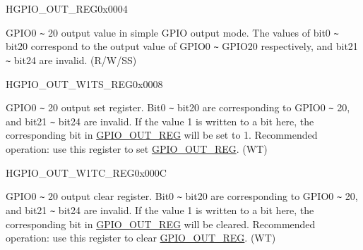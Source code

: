 

\begin{register}{H}{GPIO\_OUT\_REG}{0x0004}\label{regdesc:GPIOOUTREG}
%
%
\regnewline%
\begin{regdesc}\begin{reglist}
\label{fielddesc:GPIOOUTDATAORIG}\item [GPIO\_OUT\_DATA\_ORIG] GPIO0 \verb+~+ 20 output value in simple GPIO output mode. The values of bit0 \verb+~+ bit20 correspond to the output value of GPIO0 \verb+~+ GPIO20 respectively, and bit21 \verb+~+ bit24 are invalid. (R/W/SS)
\end{reglist}\end{regdesc}
\end{register}


\begin{register}{H}{GPIO\_OUT\_W1TS\_REG}{0x0008}\label{regdesc:GPIOOUTW1TSREG}
%
%
\regnewline%
\begin{regdesc}\begin{reglist}
\label{fielddesc:GPIOOUTW1TS}\item [GPIO\_OUT\_W1TS] GPIO0 \verb+~+ 20 output set register. Bit0 \verb+~+ bit20 are corresponding to GPIO0 \verb+~+ 20, and bit21 \verb+~+ bit24 are invalid. If the value 1 is written to a bit here, the corresponding bit in \hyperref[regdesc:GPIOOUTREG]{GPIO\_OUT\_REG} will be set to 1. Recommended operation: use this register to set \hyperref[regdesc:GPIOOUTREG]{GPIO\_OUT\_REG}. (WT)
\end{reglist}\end{regdesc}
\end{register}

\begin{register}{H}{GPIO\_OUT\_W1TC\_REG}{0x000C}\label{regdesc:GPIOOUTW1TCREG}
%
%
\regnewline%
\begin{regdesc}\begin{reglist}
\label{fielddesc:GPIOOUTW1TC}\item [GPIO\_OUT\_W1TC] GPIO0 \verb+~+ 20 output clear register. Bit0 \verb+~+ bit20 are corresponding to GPIO0 \verb+~+ 20, and bit21 \verb+~+ bit24 are invalid. If the value 1 is written to a bit here, the corresponding bit in \hyperref[regdesc:GPIOOUTREG]{GPIO\_OUT\_REG} will be cleared. Recommended operation: use this register to clear \hyperref[regdesc:GPIOOUTREG]{GPIO\_OUT\_REG}. (WT)
\end{reglist}\end{regdesc}
\end{register}




